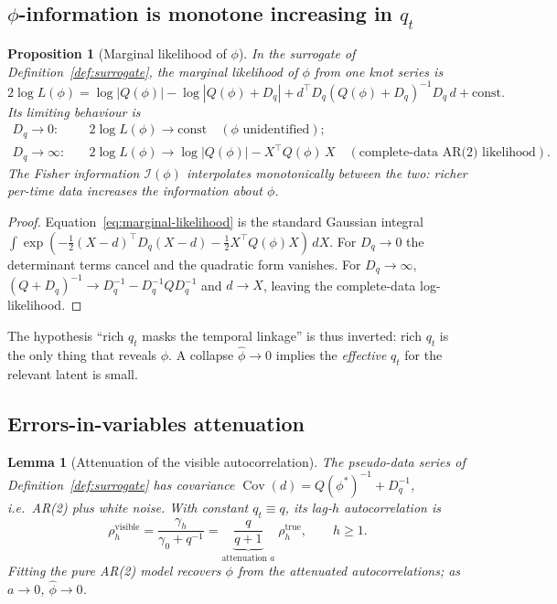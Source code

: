 \documentclass[11pt]{article}
\newtheorem{proposition}{Proposition}
\newtheorem{lemma}{Lemma}
\theoremstyle{definition}
\newcommand{\Cov}{\operatorname{Cov}}
\begin{document}
\subsection{$\phi$-information is monotone increasing in $q_t$}

\begin{proposition}[Marginal likelihood of $\phi$]
\label{prop:fisher-monotone}
In the surrogate of Definition~\ref{def:surrogate}, the marginal
likelihood of $\phi$ from one knot series is
\begin{equation}
  2 \log L(\phi)
    = \log|Q(\phi)| - \log|Q(\phi) + D_q|
    + d^\top D_q (Q(\phi) + D_q)^{-1} D_q\, d + \mathrm{const}.
  \label{eq:marginal-likelihood}
\end{equation}
Its limiting behaviour is
\begin{align}
  D_q \to 0:    &\quad 2\log L(\phi) \to \mathrm{const}
                  \quad (\phi \text{ unidentified}); \\
  D_q \to \infty:&\quad 2\log L(\phi) \to
                  \log|Q(\phi)| - X^\top Q(\phi)\, X
                  \quad (\text{complete-data AR(2) likelihood}).
\end{align}
The Fisher information $\mathcal I(\phi)$ interpolates monotonically
between the two: richer per-time data \emph{increases} the information
about $\phi$.
\end{proposition}

\begin{proof}
Equation~\eqref{eq:marginal-likelihood} is the standard Gaussian
integral $\int \exp(-\tfrac12 (X-d)^\top D_q (X-d) - \tfrac12 X^\top
Q(\phi) X)\, dX$. For $D_q \to 0$ the determinant terms cancel and the
quadratic form vanishes. For $D_q \to \infty$, $(Q+D_q)^{-1} \to
D_q^{-1} - D_q^{-1} Q D_q^{-1}$ and $d \to X$, leaving the complete-data
log-likelihood.
\end{proof}

The hypothesis ``rich $q_t$ masks the temporal linkage'' is thus
inverted: rich $q_t$ is the only thing that reveals $\phi$. A collapse
$\hat\phi \to 0$ implies the \emph{effective} $q_t$ for the relevant
latent is small.

\subsection{Errors-in-variables attenuation}

\begin{lemma}[Attenuation of the visible autocorrelation]
\label{lem:attenuation}
The pseudo-data series of Definition~\ref{def:surrogate} has
covariance $\Cov(d) = Q(\phi^\ast)^{-1} + D_q^{-1}$, i.e.\ AR(2)
\emph{plus white noise}. With constant $q_t \equiv q$, its lag-$h$
autocorrelation is
\begin{equation}
  \rho_h^{\mathrm{visible}}
    = \frac{\gamma_h}{\gamma_0 + q^{-1}}
    = \underbrace{\frac{q}{q + 1}}_{\text{attenuation } a}\;
      \rho_h^{\mathrm{true}}, \qquad h \ge 1.
  \label{eq:attenuation}
\end{equation}
Fitting the pure AR(2) model recovers $\phi$ from the attenuated
autocorrelations; as $a \to 0$, $\hat\phi \to 0$.
\end{lemma}
\end{document}

